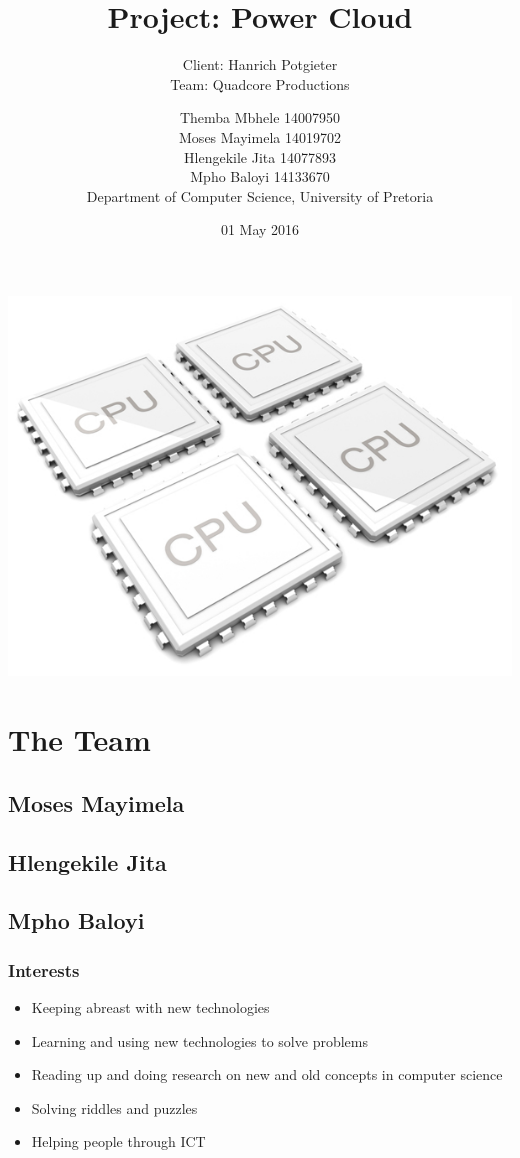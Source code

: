 \documentclass{scrartcl}
\title{Project: Power Cloud}
\subtitle{Client: Hanrich Potgieter \\ Team: Quadcore Productions\\}
\author{Themba Mbhele 14007950\\ Moses Mayimela 14019702 \\ Hlengekile Jita 14077893 \\ Mpho Baloyi 14133670 \\Department of Computer Science, University of Pretoria}
\date{01 May 2016}
\begin{document}
\maketitle
\includegraphics[width=\textwidth]{2012-quad-core-phones}
\section{The Team}
\subsection{Moses Mayimela}
\subsection{Hlengekile Jita}
\subsection{Mpho Baloyi}
\subsubsection{Interests}
\begin{itemize}
\item Keeping abreast with new technologies
\item Learning and using new technologies to solve problems
\item Reading up and doing research on new and old concepts in computer science
\item Solving riddles and puzzles
\item Helping people through ICT
\end{itemize}
\end{document}
